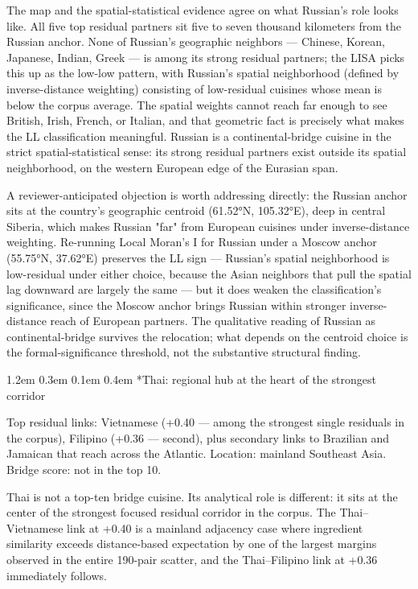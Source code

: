 \documentclass[11pt]{article}
\makeatletter
\renewcommand\subsection{\@startsection{subsection}{2}{\z@}%
  {1.2em \@plus 0.3em \@minus 0.1em}%
  {0.4em}%
  {\normalfont\large\bfseries\itshape\color{black!75}}}
\makeatother
\begin{document}
The map and the spatial-statistical evidence agree on what Russian's role looks like. All five top residual partners sit five to seven thousand kilometers from the Russian anchor. None of Russian's geographic neighbors — Chinese, Korean, Japanese, Indian, Greek — is among its strong residual partners; the LISA picks this up as the low-low pattern, with Russian's spatial neighborhood (defined by inverse-distance weighting) consisting of low-residual cuisines whose mean is below the corpus average. The spatial weights cannot reach far enough to see British, Irish, French, or Italian, and that geometric fact is precisely what makes the LL classification meaningful. Russian is a continental-bridge cuisine in the strict spatial-statistical sense: its strong residual partners exist outside its spatial neighborhood, on the western European edge of the Eurasian span.


A reviewer-anticipated objection is worth addressing directly: the Russian anchor sits at the country's geographic centroid (61.52°N, 105.32°E), deep in central Siberia, which makes Russian "far" from European cuisines under inverse-distance weighting. Re-running Local Moran's I for Russian under a Moscow anchor (55.75°N, 37.62°E) preserves the LL sign — Russian's spatial neighborhood is low-residual under either choice, because the Asian neighbors that pull the spatial lag downward are largely the same — but it does weaken the classification's significance, since the Moscow anchor brings Russian within stronger inverse-distance reach of European partners. The qualitative reading of Russian as continental-bridge survives the relocation; what depends on the centroid choice is the formal-significance threshold, not the substantive structural finding.


\subsection*{Thai: regional hub at the heart of the strongest corridor}


Top residual links: Vietnamese (+0.40 — among the strongest single residuals in the corpus), Filipino (+0.36 — second), plus secondary links to Brazilian and Jamaican that reach across the Atlantic. Location: mainland Southeast Asia. Bridge score: not in the top 10.


Thai is not a top-ten bridge cuisine. Its analytical role is different: it sits at the center of the strongest focused residual corridor in the corpus. The Thai–Vietnamese link at +0.40 is a mainland adjacency case where ingredient similarity exceeds distance-based expectation by one of the largest margins observed in the entire 190-pair scatter, and the Thai–Filipino link at +0.36 immediately follows.
\end{document}
